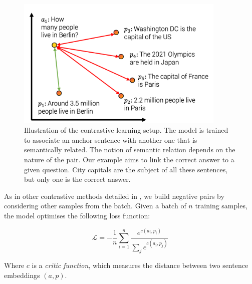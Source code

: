 \begin{figure}[htb!]
	\includegraphics[width=10cm]{images/contrastive_1.png}
	\caption[Contrastive learning]{Illustration of the contrastive learning setup. The model is trained to associate an anchor sentence with another one that is semantically related. The notion of semantic relation depends on the nature of the pair. Our example aims to link the correct answer to a given question. City capitals are the subject of all these sentences, but only one is the correct answer.}
\end{figure}

As in other contrastive methods detailed in , we build negative pairs by considering other samples from the batch. Given a batch of $n$ training samples, the model optimises the following loss function:

\begin{equation}
    \mathcal{L} = -\frac{1}{n}\sum_{i=1}^n\frac{e^{c(a_i, p_i)}}{\sum_j e^{c(a_i, p_j)}}    
\end{equation}

Where $c$ is a \textit{critic function}, which measures the distance between two sentence embeddings $(a, p)$.



